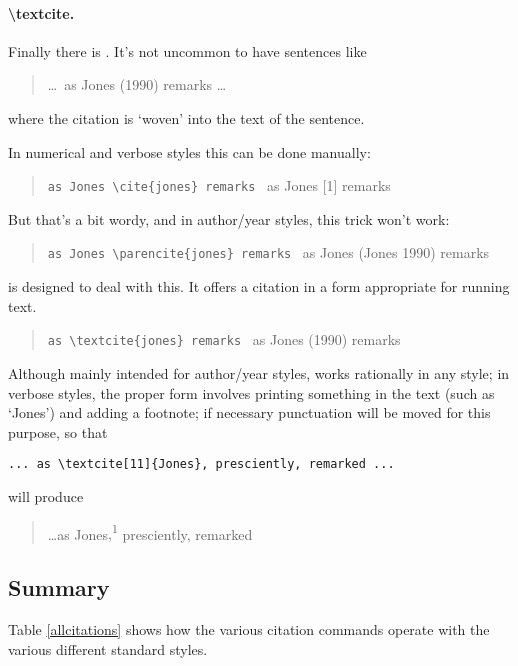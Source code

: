 \paragraph{\textbackslash textcite.} Finally there is
. It’s not uncommon to have sentences like
\begin{quote}
   \ldots\ as Jones (1990) remarks \ldots
\end{quote}
where the citation is `woven' into the text of the sentence.

In numerical and verbose styles this can be done manually:
\begin{quote}
   \verb|as Jones \cite{jones} remarks| \gives\ as Jones [1] remarks
\end{quote}
But that's a bit wordy, and in author/year styles, this trick won't work:
\begin{quote}
   \verb|as Jones \parencite{jones} remarks| \gives\ as Jones (Jones 1990) remarks
\end{quote}
 is designed to deal with this. It offers a citation in a form appropriate for running text.
\begin{quote}
   \verb|as \textcite{jones} remarks| \gives\ as Jones (1990) remarks
\end{quote}

Although mainly intended for author/year styles,  works
rationally in any style; in verbose styles, the proper form involves
printing something in the text (such as `Jones') and adding a
footnote; if necessary punctuation will be moved for this purpose, so
that
\begin{Verbatim}
... as \textcite[11]{Jones}, presciently, remarked ...
\end{Verbatim}
will produce 
\begin{quote}
  \dots as
  Jones\colorbox{red!30}{,\textsuperscript{1}}
  presciently, remarked
\end{quote}

\subsection{Summary}

Table \ref{allcitations} shows how the various citation commands
operate with the various different standard styles.

